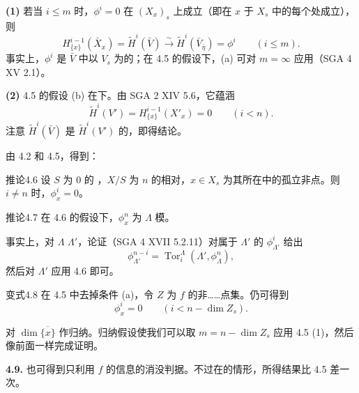 \textbf{(1)} 若当 $i\le m$ 时，$\phi^i=0$ 在 $(X_x)_s$ 上成立（即在 $x$ 于 $X_s$ 中的每个处成立），则
\[
H_{\{x\}}^{i-1}(\bar X_x)=\widetilde H^i(\bar V)
\xrightarrow{\sim}\widetilde H^i(\bar V_{\bar\eta})=\phi^i
\qquad(i\le m).
\]
事实上，$\phi^i$ 是 $\bar V$ 中以 $V_s$ 为的；在 4.5 的假设下，(a) 可对 $m=\infty$ 应用（SGA 4 XV 2.1）。

\textbf{(2)} 4.5 的假设 (b) 在下。由 SGA 2 XIV 5.6，它蕴涵
\[
\widetilde H^i(V')=H^{i-1}_{\{x\}}(X'_x)=0\qquad(i<n).
\]
注意 $\widetilde H^i(\bar V)$ 是 $\widetilde H^i(V')$ 的，即得结论。

由 4.2 和 4.5，得到：
\begin{SGAresult}{推论}{4.6}
设 $S$ 为 $0$ 的 ，$X/S$ 为 $n$ 的相对，$x\in X_s$ 为其所在中的孤立非点。则 $i\ne n$ 时，$\phi_x^i=0$。
\end{SGAresult}
\begin{SGAresult}{推论}{4.7}
在 4.6 的假设下，$\phi_x^n$ 为 $\Lambda$ 模。
\end{SGAresult}
事实上，对 $\Lambda$  $\Lambda'$，论证（SGA 4 XVII 5.2.11）对属于 $\Lambda'$ 的 $\phi_{\Lambda'}^i$ 给出
\[
\phi_{\Lambda'}^{n-i}=\operatorname{Tor}_i^\Lambda(\Lambda',\phi_\Lambda^n),
\]
然后对 $\Lambda'$ 应用 4.6 即可。

\begin{SGAresult}{变式}{4.8}
在 4.5 中去掉条件 (a)，令 $Z$ 为 $f$ 的非……点集。仍可得到
\[
\phi_x^i=0\qquad(i<n-\dim Z_s).
\]
\end{SGAresult}
对 $\dim\overline{\{x\}}$ 作归纳。归纳假设使我们可以取 $m=n-\dim Z_s$ 应用 4.5 (1)，然后像前面一样完成证明。

\textbf{4.9.} 也可得到只利用 $f$ 的信息的消没判据。不过在的情形，所得结果比 4.5 差一次。

